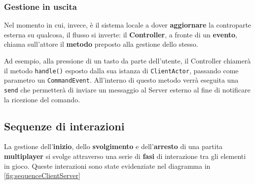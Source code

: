     \subsubsection{Gestione in uscita}
    Nel momento in cui, invece, è il sistema locale a dover \textbf{aggiornare} la controparte esterna su qualcosa, il flusso si inverte: il \textbf{Controller}, a fronte di un \textbf{evento}, chiama sull'attore il \textbf{metodo} preposto alla gestione dello stesso. 
    
    Ad esempio, alla pressione di un tasto da parte dell'utente, il Controller chiamerà il metodo \texttt{handle()} esposto dalla sua istanza di \texttt{ClientActor}, passando come parametro un \texttt{CommandEvent}. All'interno di questo metodo verrà eseguita una \texttt{send} che permetterà di inviare un messaggio al Server esterno al fine di notificare la ricezione del comando. 


\subsection{Sequenze di interazioni}
La gestione dell'\textbf{inizio}, dello \textbf{svolgimento} e dell'\textbf{arresto} di una partita \textbf{multiplayer} si svolge attraverso una serie di \textbf{fasi} di interazione tra gli elementi in gioco. Queste interazioni sono state evidenziate nel diagramma in \ref{fig:sequenceClientServer}

